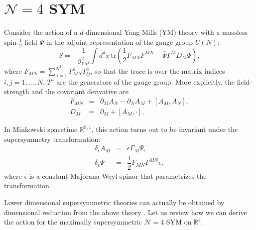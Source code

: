 \chapter{$\mathcal{N} = 4$ SYM}

Consider the action of a $d$-dimensional Yang-Mills (YM) theory 
with a massless spin-$\frac{1}{2}$ field $\Psi$ in the adjoint representation of the gauge group $U(N)$:
\begin{equation}
 S = - \dfrac{1}{g_{YM}^2} \int d^d x \, \text{tr}
     \left(
         \dfrac{1}{2}F_{M N}F^{M N}
       - \bar{\Psi} \Gamma^M D_M \Psi 
     \right),    
\end{equation}
where $F_{M N} =\sum_{a=1}^{N^2} F_{M N}^a T^a_{ij}$, so that the trace is over the matrix indices $i, j=1, \ldots, N$. 
$T^a$ are the generators of the gauge group.
More explicitly, the field-strength and the covariant derivative are
\begin{eqnarray}
 F_{MN} &=& \partial_M A_N - \partial_N A_M + [A_M, A_N],\\
 D_M &=& \partial_M  + [A_M, \cdot].
\end{eqnarray}



In Minkowski spacetime $\mathbb{R}^{9,1}$, 
this action turns out to be invariant under the supersymmetry transformation:
\begin{eqnarray}
 \delta_\epsilon A_M  & = & \epsilon \Gamma_M \Psi,\\
 \delta_\epsilon \Psi & = & \dfrac{1}{2} F_{M N} \Gamma^{M N} \epsilon,
\end{eqnarray}
where $\epsilon$ is a constant Majorana-Weyl spinor that parametrizes the transformation.

 
Lower dimensional supersymmetric theories can actually be obtained by 
dimensional reduction from the above theory \cite{Brink:1976bc}. 
Let us review how we can derive the action for the maximally supersymmetric
$\mathcal{N}=4$ SYM on $\mathbb{R}^{4}$.

